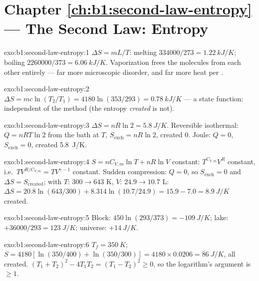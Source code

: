 \section*{Chapter \ref{ch:b1:second-law-entropy} --- The Second Law: Entropy}

\begin{solution}{exo:b1:second-law-entropy:1}
$\Delta S = mL/T$: melting $334000/273 = \qty{1.22}{kJ/K}$; boiling $2260000/
373 = \qty{6.06}{kJ/K}$. Vaporization frees the molecules from each other
entirely --- far more microscopic disorder, and far more heat per
.
\end{solution}

\begin{solution}{exo:b1:second-law-entropy:2}
$\Delta S = mc\ln(T_2/T_1) = 4180\ln(353/293) = \qty{0.78}{kJ/K}$ --- a state
function: independent of the method (the entropy \emph{created} is not).
\end{solution}

\begin{solution}{exo:b1:second-law-entropy:3}
$\Delta S = nR\ln2 = \qty{5.8}{J/K}$. Reversible isothermal: $Q = nRT\ln2$
from the bath at $T$, $S_{\mathrm{exch}} = nR\ln2$, created $0$. Joule:
$Q = 0$, $S_{\mathrm{exch}} = 0$, created \qty{5.8}{J/K}.
\end{solution}

\begin{solution}{exo:b1:second-law-entropy:4}
$S = nC_{V,m}\ln T + nR\ln V$ constant: $T^{C_{V,m}}V^R$ constant, i.e.\
$TV^{R/C_{V,m}} = TV^{\gamma - 1}$ constant. Sudden compression: $Q = 0$, so
$S_{\mathrm{exch}} = 0$ and $\Delta S = S_{\mathrm{created}}$; with $T$: $300 \to
643$ K, $V$: $24.9 \to 10.7$ L: $\Delta S = 20.8\ln(643/300) + 8.314\ln(10.7/
24.9) = 15.9 - 7.0 = \qty{+8.9}{J/K}$ created.
\end{solution}

\begin{solution}{exo:b1:second-law-entropy:5}
Block: $450\ln(293/373) = \qty{-109}{J/K}$; lake: $+36000/293 = \qty{+123}{J/K}$;
universe: $+\qty{14}{J/K}$.
\end{solution}

\begin{solution}{exo:b1:second-law-entropy:6}
$T_f = \qty{350}{K}$; $S = 4180[\ln(350/400) + \ln(350/300)] = 4180 \times
0.0206 = \qty{86}{J/K}$, all created. $(T_1 + T_2)^2 - 4T_1T_2 = (T_1 - T_2)^2
\geq 0$, so the logarithm's argument is $\geq 1$.
\end{solution}

